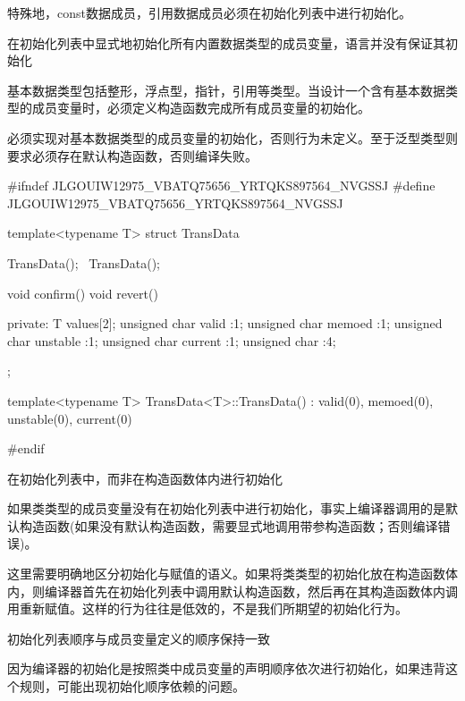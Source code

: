 \begin{content}
特殊地，const数据成员，引用数据成员必须在初始化列表中进行初始化。

\begin{regulation}
在初始化列表中显式地初始化所有内置数据类型的成员变量，\cpp{}语言并没有保证其初始化
\end{regulation}

基本数据类型包括整形，浮点型，指针，引用等类型。当设计一个含有基本数据类型的成员变量时，必须定义构造函数完成所有成员变量的初始化。

必须实现对基本数据类型的成员变量的初始化，否则行为未定义。至于泛型类型则要求必须存在默认构造函数，否则编译失败。

\begin{leftbar}
\begin{c++}[caption={\ttfamily{cub/base/TransData.h}}]
#ifndef JLGOUIW12975_VBATQ75656_YRTQKS897564_NVGSSJ
#define JLGOUIW12975_VBATQ75656_YRTQKS897564_NVGSSJ

template<typename T>
struct TransData
{
   TransData();
   ~TransData();

   void confirm()
   void revert()

private:
   T values[2];
   unsigned char valid :1;
   unsigned char memoed :1;
   unsigned char unstable :1;
   unsigned char current :1;
   unsigned char :4;
};

template<typename T>
TransData<T>::TransData()
  : valid(0), memoed(0), unstable(0), current(0)
{
}

#endif
\end{c++}
\end{leftbar}

\begin{regulation}
在初始化列表中，而非在构造函数体内进行初始化
\end{regulation}

如果类类型的成员变量没有在初始化列表中进行初始化，事实上编译器调用的是默认构造函数(如果没有默认构造函数，需要显式地调用带参构造函数；否则编译错误)。

这里需要明确地区分初始化与赋值的语义。如果将类类型的初始化放在构造函数体内，则编译器首先在初始化列表中调用默认构造函数，然后再在其构造函数体内调用重新赋值。这样的行为往往是低效的，不是我们所期望的初始化行为。

\begin{regulation}
初始化列表顺序与成员变量定义的顺序保持一致
\end{regulation}

因为编译器的初始化是按照类中成员变量的声明顺序依次进行初始化，如果违背这个规则，可能出现初始化顺序依赖的问题。


\end{content}
